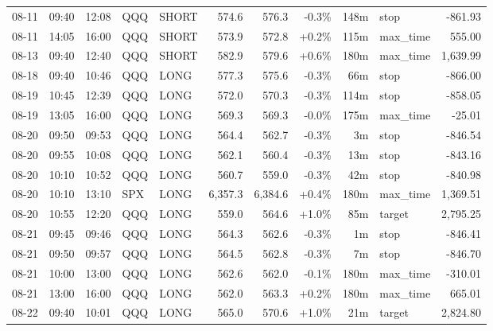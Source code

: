 \documentclass[11pt,a4paper,twoside]{article}
\begin{document}
\begin{center}
\begin{longtable}{>{\color{txtmain}}l l l l l r r r r >{\color{txtmain}}l r}
08-11 & 09:40 & 12:08 & QQQ & SHORT & 574.6 & 576.3 & \textcolor{lossred}{-0.3\%} & 148m & stop & \textcolor{lossred}{-861.93} \\
08-11 & 14:05 & 16:00 & QQQ & SHORT & 573.9 & 572.8 & \textcolor{wingreen}{+0.2\%} & 115m & max\_time & \textcolor{wingreen}{555.00} \\
08-13 & 09:40 & 12:40 & QQQ & SHORT & 582.9 & 579.6 & \textcolor{wingreen}{+0.6\%} & 180m & max\_time & \textcolor{wingreen}{1,639.99} \\
08-18 & 09:40 & 10:46 & QQQ & LONG & 577.3 & 575.6 & \textcolor{lossred}{-0.3\%} & 66m & stop & \textcolor{lossred}{-866.00} \\
08-19 & 10:45 & 12:39 & QQQ & LONG & 572.0 & 570.3 & \textcolor{lossred}{-0.3\%} & 114m & stop & \textcolor{lossred}{-858.05} \\
08-19 & 13:05 & 16:00 & QQQ & LONG & 569.3 & 569.3 & \textcolor{lossred}{-0.0\%} & 175m & max\_time & \textcolor{lossred}{-25.01} \\
08-20 & 09:50 & 09:53 & QQQ & LONG & 564.4 & 562.7 & \textcolor{lossred}{-0.3\%} & 3m & stop & \textcolor{lossred}{-846.54} \\
08-20 & 09:55 & 10:08 & QQQ & LONG & 562.1 & 560.4 & \textcolor{lossred}{-0.3\%} & 13m & stop & \textcolor{lossred}{-843.16} \\
08-20 & 10:10 & 10:52 & QQQ & LONG & 560.7 & 559.0 & \textcolor{lossred}{-0.3\%} & 42m & stop & \textcolor{lossred}{-840.98} \\
08-20 & 10:10 & 13:10 & SPX & LONG & 6,357.3 & 6,384.6 & \textcolor{wingreen}{+0.4\%} & 180m & max\_time & \textcolor{wingreen}{1,369.51} \\
08-20 & 10:55 & 12:20 & QQQ & LONG & 559.0 & 564.6 & \textcolor{wingreen}{+1.0\%} & 85m & target & \textcolor{wingreen}{2,795.25} \\
08-21 & 09:45 & 09:46 & QQQ & LONG & 564.3 & 562.6 & \textcolor{lossred}{-0.3\%} & 1m & stop & \textcolor{lossred}{-846.41} \\
08-21 & 09:50 & 09:57 & QQQ & LONG & 564.5 & 562.8 & \textcolor{lossred}{-0.3\%} & 7m & stop & \textcolor{lossred}{-846.70} \\
08-21 & 10:00 & 13:00 & QQQ & LONG & 562.6 & 562.0 & \textcolor{lossred}{-0.1\%} & 180m & max\_time & \textcolor{lossred}{-310.01} \\
08-21 & 13:00 & 16:00 & QQQ & LONG & 562.0 & 563.3 & \textcolor{wingreen}{+0.2\%} & 180m & max\_time & \textcolor{wingreen}{665.01} \\
08-22 & 09:40 & 10:01 & QQQ & LONG & 565.0 & 570.6 & \textcolor{wingreen}{+1.0\%} & 21m & target & \textcolor{wingreen}{2,824.80} \\

\end{longtable}
\end{center}
\end{document}
